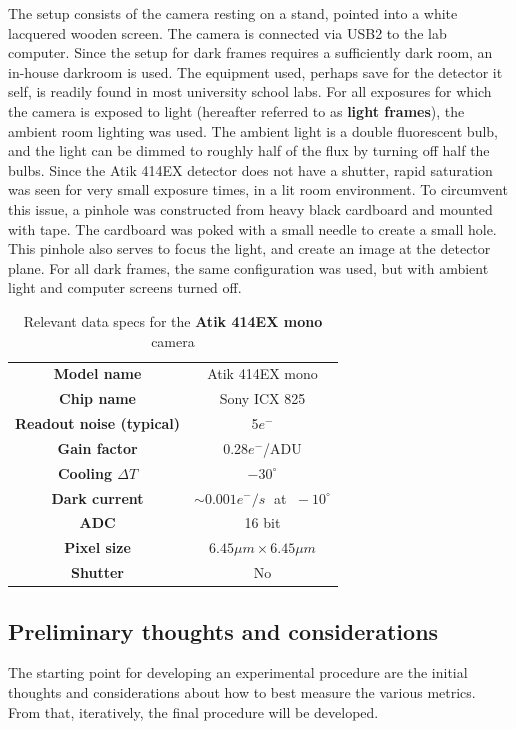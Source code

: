 \documentclass[../main.tex]{subfiles}
\begin{document}
		The setup consists of the camera resting on a stand, pointed into a white lacquered wooden screen. The camera is connected via USB2 to the lab computer. Since the setup for dark frames requires a sufficiently dark room, an in-house darkroom is used. The equipment used, perhaps save for the detector it self, is readily found in most university school labs.
		For all exposures for which the camera is exposed to light (hereafter referred to as \textbf{light frames}), the ambient room lighting was used. The ambient light is a double fluorescent bulb, and the light can be dimmed to roughly half of the flux by turning off half the bulbs. Since the Atik 414EX detector does not have a shutter, rapid saturation was seen for very small exposure times, in a lit room environment. To circumvent this issue, a pinhole was constructed from heavy black cardboard and mounted with tape. The cardboard was poked with a small needle to create a small hole. This pinhole also serves to focus the light, and create an image at the detector plane.
		For all dark frames, the same configuration was used, but with ambient light and computer screens turned off. 
		
		\begin{table}[]
			\centering
			\begin{tabular}{|c|c|}
				\hline
				\textbf{Model name }& Atik 414EX mono \\
				\textbf{Chip name}& Sony ICX 825\\
				\textbf{Readout noise (typical)}& 5$e^-$\\
				\textbf{Gain factor}& 0.28$e^-$/ADU\\
				\textbf{Cooling $\Delta T$}& $-30^\circ$\\
				\textbf{Dark current}& $\sim 0.001 e^- / s\;$ at $\;-10^\circ$ \\
				\textbf{ADC}& 16 bit\\
				\textbf{Pixel size}& $6.45 \mu m \times 6.45 \mu m$\\ 
				\textbf{Shutter}&No\\
				\hline
			\end{tabular}
		\caption{Relevant data specs for the \textbf{Atik 414EX mono} camera \cite{atik414specs}}\label{table:testcam}
		\end{table}
			
	\subsection{Preliminary thoughts and considerations}
	The starting point for developing an experimental procedure are the initial thoughts and considerations about how to best measure the various metrics. From that, iteratively, the final procedure will be developed. 
	
\end{document}

